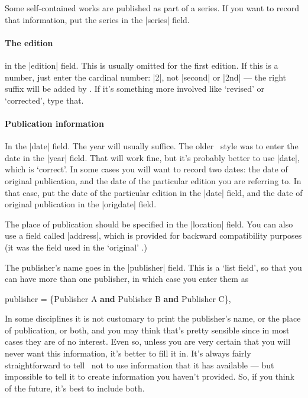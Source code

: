 {Some self-contained works are published as part of a series. If you
want to record that information, put the series in the |series| field.

\paragraph{The edition} in the |edition| field. This is usually
omitted for the first edition. If this is a number, just enter the
cardinal number: |{2}|, not |second| or |2nd| --- the right suffix
will be added by \biblatex. If it's something more involved like
`revised' or `corrected', type that.

\paragraph{Publication information} 

In the |date| field. The year will usually suffice. The older \bibtex\
style was to enter the date in the |year| field. That will work fine,
but it's probably better to use |date|, which is `correct'. In some
cases you will want to record two dates: the date of original
publication, and the date of the particular edition you are referring
to. In that case, put the date of the particular edition in the |date|
field, and the date of original publication in the |origdate| field.

The place of publication should be specified in the |location|
field. You can also use a field called |address|, which is provided
for backward compatibility purposes (it was the field used in the
`original' \bibtex.)

The publisher's name goes in the |publisher| field. This is a `list
field', so that you can have more than one publisher, in which case
you enter them as
\begin{center}
\ttfamily
publisher = \{Publisher A \textbf{and} Publisher B \textbf{and} Publisher C\},
\end{center}

In some disciplines it is not customary to print the publisher's name,
or the place of publication, or both, and you may think that's pretty
sensible since in most cases they are of no interest. Even so, unless
you are very certain that you will never want this information, it's
better to fill it in. It's always fairly straightforward to tell
\biblatex\ not to use information that it has available --- but
impossible to tell it to create information you haven't provided. So,
if you think of the future, it's best to include both.

}
